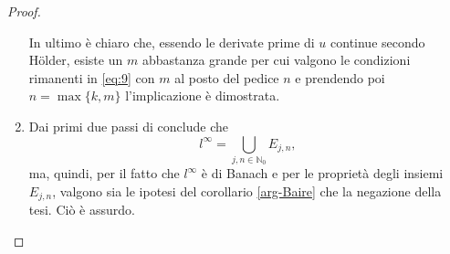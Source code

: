 \begin{example}
\begin{proof}
\begin{enumerate}
In ultimo è chiaro che, essendo le derivate prime di $u$ continue secondo Hölder, esiste un $m$ abbastanza grande per cui valgono le condizioni rimanenti in \eqref{eq:9} con $m$ al posto del pedice $n$ e prendendo poi $n=\max\{k,m\}$ l'implicazione è dimostrata.

\item
Dai primi due passi di conclude che $$l^{\infty}=\bigcup\limits_{j,n \in \mathbb{N}_0}E_{j,n},$$ ma, quindi, per il fatto che $l^{\infty}$ è di Banach e per le proprietà degli insiemi $E_{j,n}$, valgono sia le ipotesi del corollario \ref{arg-Baire} che la negazione della tesi. Ciò è assurdo.
\end{enumerate}
\end{proof}

\end{example}



